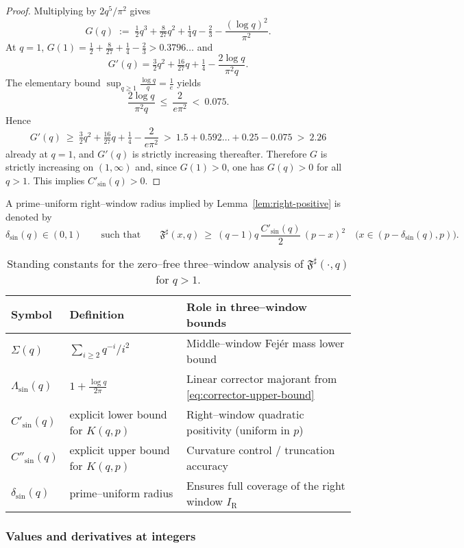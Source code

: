 \documentclass[11pt,a4paper]{amsart}
\newcommand{\Fbase}{\mathfrak F}
\newcommand{\Fsharp}{\Fbase^{\sharp}}
\theoremstyle{plain}
\theoremstyle{definition}
\theoremstyle{remark}
\begin{document}
\begin{proof}
Multiplying by $2q^5/\pi^2$ gives
\[
G(q)\;:=\;\tfrac12 q^3+\tfrac{8}{27}q^2+\tfrac14 q-\tfrac{2}{3}-\frac{(\log q)^2}{\pi^2}.
\]
At $q=1$,
\(
G(1)=\tfrac12+\tfrac{8}{27}+\tfrac14-\tfrac23>0.3796\ldots
\)
and
\[
G'(q)=\tfrac{3}{2}q^2+\tfrac{16}{27}q+\tfrac14-\frac{2\log q}{\pi^2 q}.
\]
The elementary bound $\sup_{q\ge 1}\frac{\log q}{q}=\frac{1}{e}$ yields
\[
\frac{2\log q}{\pi^2 q}\ \le\ \frac{2}{e\pi^2}\ <\ 0.075.
\]
Hence
\[
G'(q)\ \ge\ \tfrac{3}{2}q^2+\tfrac{16}{27}q+\tfrac14-\frac{2}{e\pi^2}\ >\ 1.5+0.592\ldots+0.25-0.075\ >\ 2.26
\]
already at $q=1$, and $G'(q)$ is strictly increasing thereafter. Therefore $G$ is strictly increasing on $(1,\infty)$ and, since $G(1)>0$, one has $G(q)>0$ for all $q>1$. This implies $C'_{\sin}(q)>0$.
\end{proof}

A prime–uniform right–window radius implied by Lemma~\ref{lem:right-positive} is denoted by
\[
\delta_{\sin}(q)\in(0,1)\qquad\text{such that}\qquad
\Fsharp(x,q)\ \ge\ (q-1)q\,\frac{C'_{\sin}(q)}{2}\,(p-x)^2
\quad\bigl(x\in(p-\delta_{\sin}(q),p)\bigr).
\]

\begin{table}[h!]
\centering
\small
\setlength{\tabcolsep}{6pt}
\begin{tabularx}{\linewidth}{@{}l l X@{}}
\toprule
Symbol & Definition & Role in three–window bounds \\ \midrule
$\Sigma(q)$ & $\displaystyle \sum_{i\ge2} q^{-i}/i^2$ & Middle–window Fej\'er mass lower bound \\
$\Lambda_{\sin}(q)$ & $\displaystyle 1+\frac{\log q}{2\pi}$ & Linear corrector majorant from \eqref{eq:corrector-upper-bound} \\
$C'_{\sin}(q)$ & explicit lower bound for $K(q,p)$ & Right–window quadratic positivity (uniform in $p$) \\
$C''_{\sin}(q)$ & explicit upper bound for $K(q,p)$ & Curvature control / truncation accuracy \\
$\delta_{\sin}(q)$ & prime–uniform radius & Ensures full coverage of the right window $I_{\mathrm R}$ \\
\bottomrule
\end{tabularx}
\caption{Standing constants for the zero–free three–window analysis of $\Fsharp(\cdot,q)$ for $q>1$.}
\label{tab:three-window-constants}
\end{table}

\subsubsection{Values and derivatives at integers}
\end{document}
